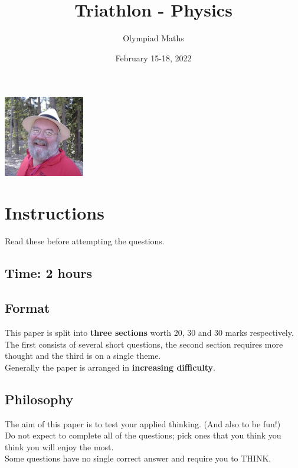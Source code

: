 \documentclass{exam}
\title{Triathlon - Physics}
\author{Olympiad Maths}
\date{February 15-18, 2022}
\begin{document}
\large
\maketitle

\begin{center}
    \vspace{-10pt}
    \includegraphics[height=100pt]{geoffsmith}
    \vspace{-10pt}
\end{center}

\section* {Instructions}

Read these before attempting the questions.

\subsection*{Time: 2 hours}

\subsection*{Format}
This paper is split into \textbf{three sections} worth 20, 30 and 30 marks respectively.\\
The first consists of several short questions, the second section requires more thought and the third is on a single theme.\\
Generally the paper is arranged in \textbf{increasing difficulty}.

\subsection*{Philosophy}
The aim of this paper is to test your applied thinking. (And also to be fun!)\\
Do not expect to complete all of the questions; pick ones that you think you think you will enjoy the most.\\
Some questions have no single correct answer and require you to THINK.
\end{document}
